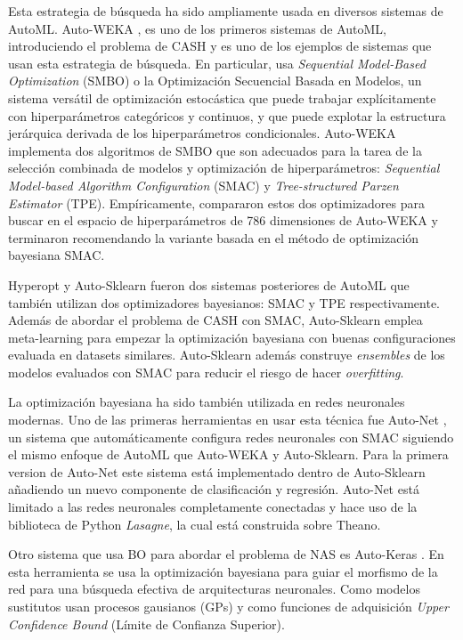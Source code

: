 Esta estrategia de búsqueda ha sido ampliamente usada en diversos sistemas de AutoML. Auto-WEKA \cite{thornton2013auto}, es uno de los primeros sistemas de AutoML, introduciendo el problema de CASH y es uno de los ejemplos de sistemas que usan esta estrategia de búsqueda. En particular, usa \textit{Sequential Model-Based Optimization} (SMBO) o la Optimización Secuencial Basada en Modelos, un sistema versátil de optimización estocástica que puede trabajar explícitamente con hiperparámetros categóricos y continuos, y que puede explotar la estructura jerárquica derivada de los hiperparámetros condicionales. Auto-WEKA implementa dos algoritmos de SMBO que son adecuados para la tarea de la selección combinada de modelos y optimización de hiperparámetros: \textit{Sequential Model-based Algorithm Configuration} (SMAC) y \textit{Tree-structured Parzen Estimator} (TPE). Empíricamente, compararon estos dos optimizadores para buscar en el espacio de hiperparámetros de 786 dimensiones de Auto-WEKA y terminaron recomendando la variante basada en el método de optimización bayesiana SMAC.

Hyperopt \cite{bergstra2013hyperopt} y Auto-Sklearn \cite{fuerer2015efficient} fueron dos sistemas posteriores de AutoML que también utilizan dos optimizadores bayesianos: SMAC y TPE respectivamente. Además de abordar el problema de CASH con SMAC, Auto-Sklearn emplea meta-learning para empezar la optimización bayesiana con buenas configuraciones \cite{fuerer2015initializing} evaluada en datasets similares. Auto-Sklearn además construye \textit{ensembles} de los modelos evaluados con SMAC \cite{hutter2011sequential} para reducir el riesgo de hacer \textit{overfitting}.

La optimización bayesiana ha sido también utilizada en redes neuronales modernas. Uno de las primeras herramientas en usar esta técnica fue Auto-Net \cite{mendoza2016towards}, un sistema que automáticamente configura redes neuronales con SMAC siguiendo el mismo enfoque de AutoML que Auto-WEKA y Auto-Sklearn. Para la primera version de Auto-Net este sistema está implementado dentro de Auto-Sklearn añadiendo un nuevo componente de clasificación y regresión. Auto-Net está limitado a las redes neuronales completamente conectadas y hace uso de la biblioteca de Python \textit{Lasagne}, la cual está construida sobre Theano.

Otro sistema que usa BO para abordar el problema de NAS es Auto-Keras \cite{jin2019auto}. En esta herramienta se usa la optimización bayesiana para guiar el morfismo de la red para una búsqueda efectiva de arquitecturas neuronales. Como modelos sustitutos usan procesos gausianos (GPs) y como funciones de adquisición \textit{Upper Confidence Bound} (Límite de Confianza Superior).

